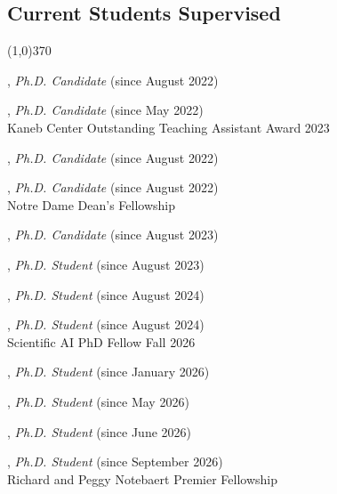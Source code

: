 \documentclass[10pt]{article}
\newenvironment{myindentpar}[1]%
{\begin{list}{}%
         {\setlength{\leftmargin}{#1}}%
         \item[]%
}
{\end{list}}
\newcounter{list}
\begin{document}
\subsection{\sc Current Students Supervised}
\vspace{-0.4cm} \line(1,0){370} \vspace{-0.1cm}

\begin{myindentpar}{0.75cm}

\hspace{-0.75cm}{\bf Bang Nguyen}, \textit{Ph.D. Candidate} (since August 2022)

\hspace{-0.75cm}{\bf Noah Ziems}, \textit{Ph.D. Candidate} (since May 2022) \\
	{Kaneb Center Outstanding Teaching Assistant Award 2023}

\hspace{-0.75cm}{\bf Hy Dang}, \textit{Ph.D. Candidate} (since August 2022)

\hspace{-0.75cm}{\bf Eric Inae}, \textit{Ph.D. Candidate} (since August 2022) \\
	{Notre Dame Dean's Fellowship}

\hspace{-0.75cm}{\bf Zhaoxuan Tan}, \textit{Ph.D. Candidate} (since August 2023)

\hspace{-0.75cm}{\bf Mengzhao Jia}, \textit{Ph.D. Student} (since August 2023)

\hspace{-0.75cm}{\bf Yining Lu}, \textit{Ph.D. Student} (since August 2024)

\hspace{-0.75cm}{\bf Yihan Zhu}, \textit{Ph.D. Student} (since August 2024) \\
	{Scientific AI PhD Fellow Fall 2026}

\hspace{-0.75cm}{\bf Weijiang (Vicky) Li}, \textit{Ph.D. Student} (since January 2026)

\hspace{-0.75cm}{\bf Chuhan Wang}, \textit{Ph.D. Student} (since May 2026)

\hspace{-0.75cm}{\bf Jinduo Guo}, \textit{Ph.D. Student} (since June 2026)

\hspace{-0.75cm}{\bf Trevor Carter}, \textit{Ph.D. Student} (since September 2026) \\
	{Richard and Peggy Notebaert Premier Fellowship}	


\end{myindentpar}
\end{document}
